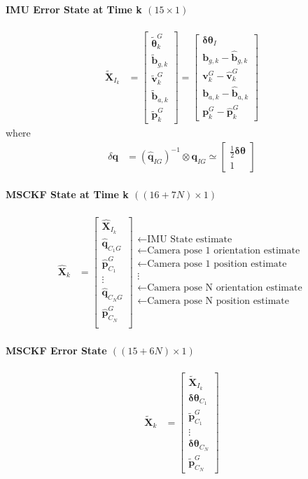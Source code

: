 \documentclass[10pt,letterpaper,fleqn,oneside]{article}
\newcommand{\nl}{\\[0.5em]}
\def\Vec#1{\mathbf{#1}} %
\newcommand{\bbm}{\begin{bmatrix}}
\newcommand{\ebm}{\end{bmatrix}}
\begin{document}
\paragraph{IMU Error State at Time k $(15\times1)$}
\begin{align}
\widetilde{\Vec{X}}_{I_k} &= 	\bbm \widetilde{\boldsymbol{\theta}}^G_k \nl
										\widetilde{\Vec{b}}_{g,k} \nl
										\widetilde{\Vec{v}}^G_k \nl
										\widetilde{\Vec{b}}_{a,k} \nl
										\widetilde{\Vec{p}}^G_k 
								\ebm
								=
								\bbm
										\boldsymbol{\delta\theta}_I \nl
										\Vec{b}_{g,k} - \hat{\Vec{b}}_{g,k} \nl
										\Vec{v}^G_k - \hat{\Vec{v}}^G_k \nl
										\Vec{b}_{a,k} - \hat{\Vec{b}}_{a,k} \nl
										\Vec{p}^G_k - \hat{\Vec{p}}^G_k 
								\ebm
\end{align}
where
\begin{align}
\delta\Vec{q} &= \left(\hat{\Vec{q}}_{I G}\right)^{-1} \otimes \Vec{q}_{I G} \simeq \bbm \frac{1}{2}\boldsymbol{\delta\theta} \nl 1 \ebm
\end{align}

\paragraph{MSCKF State at Time k $((16+7N)\times1)$}
\begin{align}
\hat{\Vec{X}}_k &= \bbm	\hat{\Vec{X}}_{I_k} \nl
										\hat{\Vec{q}}_{C_1 G} \nl
										\hat{\Vec{p}}^G_{C_1} \nl
										\vdots \nl
										\hat{\Vec{q}}_{C_N G} \nl
										\hat{\Vec{p}}^G_{C_N} \nl										
								\ebm
								\begin{array}{l}
								\leftarrow \text{IMU State estimate} \nl
								\leftarrow \text{Camera pose 1 orientation estimate} \nl
								\leftarrow \text{Camera pose 1 position estimate} \nl
								\vdots \nl
								\leftarrow \text{Camera pose N orientation estimate} \nl
								\leftarrow \text{Camera pose N position estimate} \nl
								\end{array}		
\end{align}

\paragraph{MSCKF Error State $((15 + 6N) \times 1)$}
\begin{align}
\widetilde{\Vec{X}}_k &= \bbm	\widetilde{\Vec{X}}_{I_k} \nl
											\boldsymbol{\delta\theta}_{C_1} \nl
											\widetilde{\Vec{p}}^G_{C_1} \nl
											\vdots \nl
											\boldsymbol{\delta\theta}_{C_N} \nl
											\widetilde{\Vec{p}}^G_{C_N}
								\ebm
\end{align}
\end{document}
